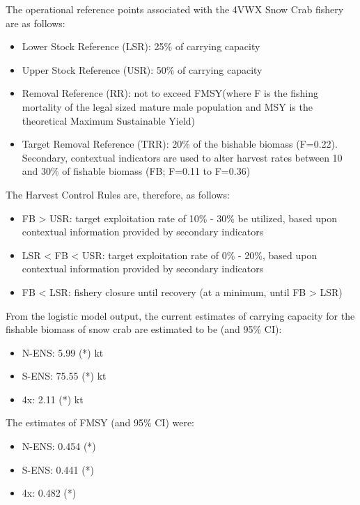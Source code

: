 \documentclass[paper=a4, fontsize=11pt]{article}
\begin{document}
The operational reference points associated with the 4VWX Snow Crab fishery are as follows: 
\begin{itemize}
  \item Lower Stock Reference (LSR): 25\% of carrying capacity\
  \item Upper Stock Reference (USR): 50\% of carrying capacity\
  \item Removal Reference (RR): not to exceed FMSY(where F is the fishing mortality of the legal sized mature male population and MSY is the theoretical Maximum Sustainable Yield)\
  \item Target Removal Reference (TRR): 20\% of the bishable biomass (F=0.22). Secondary, contextual indicators are used to alter harvest rates between 10 and 30\% of fishable biomass (FB; F=0.11 to F=0.36)
\end{itemize}

The Harvest Control Rules are, therefore, as follows:\
\begin{itemize}
  \item FB > USR: target exploitation rate of 10\% - 30\% be utilized, based upon contextual information provided by secondary indicators\
  \item LSR < FB < USR: target exploitation rate of 0\% - 20\%, based upon contextual information provided by secondary indicators\
  \item FB < LSR: fishery closure until recovery (at a minimum, until FB > LSR)\\
\end{itemize}
\clearpage

From the logistic model output, the current estimates of carrying capacity for the fishable biomass of snow crab are estimated to be (and 95\% CI):\
\begin{itemize}
  \item N-ENS: 5.99 (*) kt\
  \item S-ENS: 75.55 (*) kt\
  \item 4x: 2.11 (*) kt\\
\end{itemize}

The estimates of FMSY (and 95\% CI) were:\
\begin{itemize}
  \item N-ENS: 0.454 (*)\
  \item S-ENS: 0.441 (*)\
  \item 4x: 0.482 (*)\\
\end{itemize}
\end{document}
